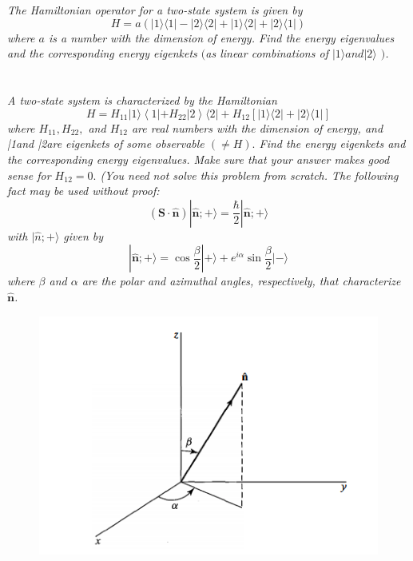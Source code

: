 \documentclass{article}
\begin{document}
\newpage
\section{}
\textit{The Hamiltonian operator for a two-state system is given by
$$
H=a(|1\rangle\langle 1|-| 2\rangle\langle 2|+| 1\rangle\langle 2|+| 2\rangle\langle 1|)
$$
where $a$ is a number with the dimension of energy. Find the energy eigenvalues and the corresponding energy eigenkets $($as linear combinations of $|1\rangle and |2\rangle$ $)$.}

\newpage

\section{}
\textit{A two-state system is characterized by the Hamiltonian
$$
H=H_{11}|1\rangle\left\langle 1\left|+H_{22}\right| 2\right\rangle\langle 2|+H_{12}[|1\rangle\langle 2|+| 2\rangle\langle 1|]
$$
where $H_{11}, H_{22},$ and $H_{12}$ are real numbers with the dimension of energy, and |1\rangle and |2\rangle are eigenkets of some observable $(\neq H) .$ Find the energy eigenkets and the corresponding energy eigenvalues. Make sure that your answer makes good sense for $H_{12}=0 .$ (You need not solve this problem from scratch. The following fact may be used without proof:
$$
(\mathbf{S} \cdot \hat{\mathbf{n}})|\hat{\mathbf{n}} ;+\rangle=\frac{\hbar}{2}|\hat{\mathbf{n}} ;+\rangle
$$
with $|\hat{n} ;+\rangle$ given by
$$
|\hat{\mathbf{n}} ;+\rangle=\cos \frac{\beta}{2}|+\rangle+e^{i \alpha} \sin \frac{\beta}{2}|-\rangle
$$
where $\beta$ and $\alpha$ are the polar and azimuthal angles, respectively, that characterize $\hat{\mathbf{n}}$. }

\begin{figure}[h!]
    \centering
    \includegraphics{figures/problem5.png}
    \label{fig:my_label}
\end{figure}
\end{document}
